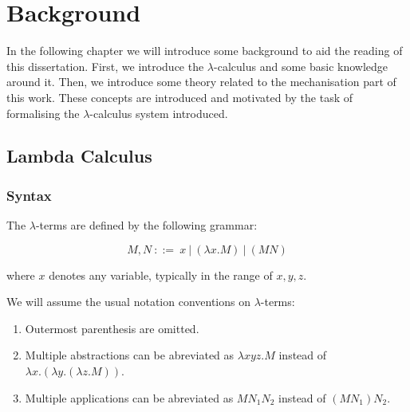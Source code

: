 \chapter{Background}
\label{c:background}


In the following chapter we will introduce some background to aid the reading of this dissertation.
First, we introduce the $\lambda$-calculus and some basic knowledge around it. Then, we introduce some theory related to the mechanisation part of this work. These concepts are introduced and motivated by the task of formalising the $\lambda$-calculus system introduced.

\section{Lambda Calculus}

\subsection{Syntax}

\cite{Hindley1997} \cite{Barendregt1987}

\begin{definition}
  The $\lambda$-terms are defined by the following grammar:

  \[ M, N \ ::= \ x \ | \ (\lambda x . M) \ | \ (M N) \]

  where $x$ denotes any variable, typically in the range of $x, y, z$.
\end{definition}

\begin{notation}
  We will assume the usual notation conventions on $\lambda$-terms:

  \begin{enumerate}
  \item Outermost parenthesis are omitted.
  \item Multiple abstractions can be abreviated as $\lambda x y z . M$ instead of  $\lambda x . (\lambda y . (\lambda z . M))$.
  \item Multiple applications can be abreviated as $M N_1 N_2$ instead of $(M N_1) N_2$.
  \end{enumerate}
\end{notation}

